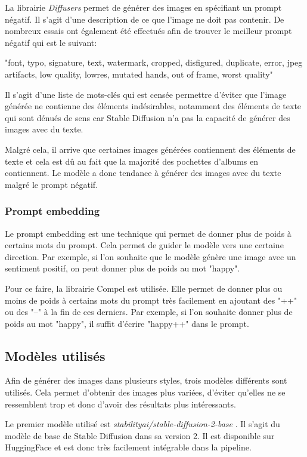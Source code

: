 La librairie \textit{Diffusers} permet de générer des images en spécifiant un prompt négatif. 
Il s'agit d'une description de ce que l'image ne doit pas contenir. De nombreux essais ont également été effectués afin de trouver le meilleur prompt négatif qui est le suivant:

"font, typo, signature, text, watermark, cropped, disfigured, duplicate, error, jpeg artifacts, low quality, lowres, mutated hands, out of frame, worst quality"

Il s'agit d'une liste de mots-clés qui est censée permettre d'éviter que l'image générée ne contienne des éléments indésirables, notamment des éléments de texte qui sont dénués de sens car Stable Diffusion n'a pas la capacité de générer des images avec du texte.

Malgré cela, il arrive que certaines images générées contiennent des éléments de texte et cela est dû au fait que la majorité des pochettes d'albums en contiennent. Le modèle a donc tendance à générer des images avec du texte malgré le prompt négatif.

\subsubsection*{Prompt embedding}
Le prompt embedding est une technique qui permet de donner plus de poids à certains mots du prompt.
Cela permet de guider le modèle vers une certaine direction. Par exemple, si l'on souhaite que le modèle génère une image avec un sentiment positif, on peut donner plus de poids au mot "happy".

Pour ce faire, la librairie Compel \cite{compel} est utilisée. Elle permet de donner plus ou moins de poids à certains mots du prompt très facilement
en ajoutant des "++" ou des "--" à la fin de ces derniers. Par exemple, si l'on souhaite donner plus de poids au mot "happy", il suffit d'écrire "happy++" dans le prompt.

\subsection{Modèles utilisés}
Afin de générer des images dans plusieurs styles, trois modèles différents sont utilisés. Cela permet d'obtenir des images plus variées, d'éviter qu'elles ne se ressemblent trop et donc d'avoir des résultats plus intéressants.

Le premier modèle utilisé est \textit{stabilityai/stable-diffusion-2-base} \cite{stabilityai/stable-diffusion-2-base}. 
Il s'agit du modèle de base de Stable Diffusion dans sa version 2. Il est disponible sur HuggingFace et est donc très facilement intégrable dans la pipeline.

